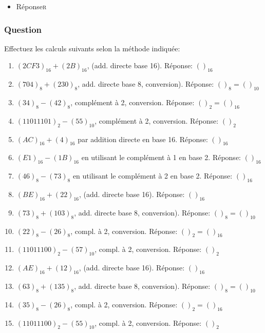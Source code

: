 \documentclass[11pt]{article}
\begin{document}
\begin{itemize}
\item Réponse\hfill{}\textsc{r}
\label{sec:orga289cc3}
\end{itemize}

\subsubsection*{Question}
\label{sec:org0beb012}
Effectuez les calculs suivants selon la méthode indiquée:

\begin{enumerate}
\item \((2CF3)_{16} + (2B)_{16}\), (add. directe base 16). Réponse: \(( )_{16}\)

\item \((704)_{8} + (230)_{8}\), add. directe base 8, conversion). Réponse: \(( )_{8} = ( )_{10}\)

\item \((34)_{8} - (42)_{8}\), complément à 2, conversion. Réponse: \(( )_{2} = ( )_{16}\)

\item \((11011101)_{2} - (55)_{10}\), complément à 2, conversion. Réponse: \(( )_{2}\)

\item \((AC)_{16} + (4)_{16}\) par addition directe en base 16. Réponse: \(( )_{16}\)

\item \((E1)_{16} - (1B)_{16}\) en utilisant le complément à 1 en base 2. Réponse: \(( )_{16}\)

\item \((46)_{8} - (73)_{8}\) en utilisant le complément à 2 en base 2. Réponse: \(( )_{16}\)

\item \((BE)_{16} + (22)_{16}\), (add. directe base 16). Réponse: \(( )_{16}\)

\item \((73)_{8} + (103)_{8}\), add. directe base 8, conversion). Réponse: \(( )_{8} = ( )_{10}\)

\item \((22)_{8} - (26)_{8}\), compl. à 2, conversion. Réponse: \(( )_{2} = ( )_{16}\)

\item \((11011100)_{2} - (57)_{10}\), compl. à 2, conversion. Réponse: \(( )_{2}\)

\item \((AE)_{16} + (12)_{16}\), (add. directe base 16). Réponse: \(( )_{16}\)

\item \((63)_{8} + (135)_{8}\), add. directe base 8, conversion). Réponse: \(( )_{8} = ( )_{10}\)

\item \((35)_{8} - (26)_{8}\), compl. à 2, conversion. Réponse: \(( )_{2} = ( )_{16}\)

\item \((11011100)_{2} - (55)_{10}\), compl. à 2, conversion. Réponse: \(( )_{2}\)
\end{enumerate}
\end{document}
